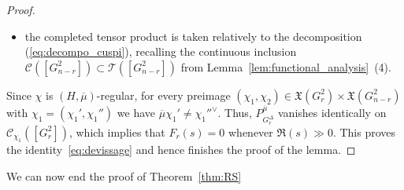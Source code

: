 \documentclass[letterpaper,11pt]{amsart}
\newcommand{\<}{\negthickspace}
\theoremstyle{definition}
\theoremstyle{plain}
\theoremstyle{remark}
\numberwithin{equation}{section}
\begin{document}
\begin{proof}
\begin{itemize}
    \item the completed tensor product is taken relatively to the
        decomposition (\ref{eq:decompo_cuspi}), recalling the continuous inclusion $\mathcal{C}([G^2_{n-r}]) \subset
        \mathcal{T}([G^2_{n-r}])$ from Lemma~\ref{lem:functional_analysis}~(4).
\end{itemize}

Since $\chi$ is $(H, \overline{\mu})$-regular, for every preimage $(\chi_1,\chi_2)
\in \mathfrak{X}(G_r^2) \times \mathfrak{X}(G_{n-r}^2)$ with
$\chi_1=(\chi_1',\chi_1'')$ we have $\overline{\mu} \chi_1' \neq  \chi_1''^{\vee}$. Thus,
$P_{G_r^\Delta}^{\overline{\mu}}$ vanishes identically on
$\mathcal{C}_{\chi_1}([G_r^2])$, which implies that $F_r(s)=0$ whenever
$\Re(s) \gg 0$. This proves the identity~\eqref{eq:devissage} and hence
finishes the proof of the lemma.
\end{proof}

We can now end the proof of Theorem~\ref{thm:RS}
\end{document}

